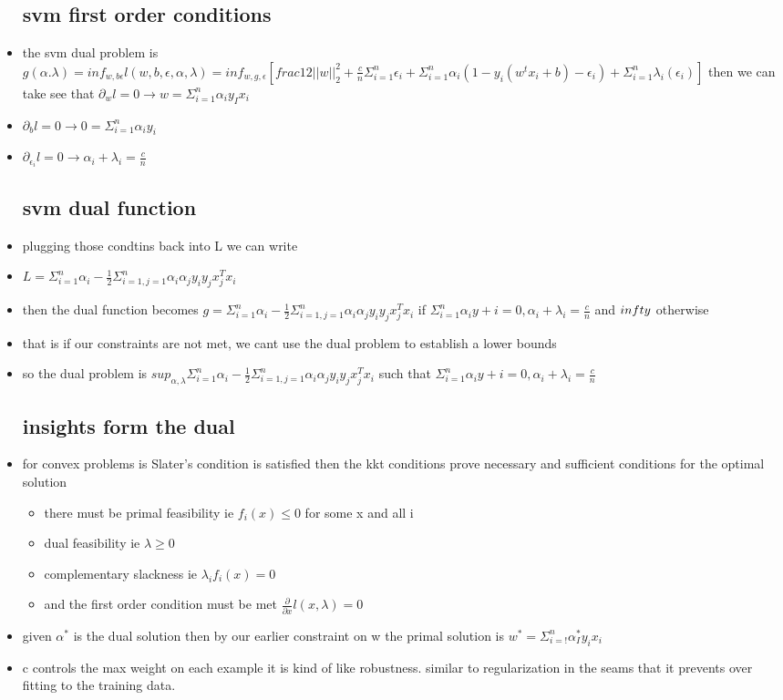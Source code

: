 \documentclass{article}
\begin{document}
\begin{itemize}
\subsection{svm first order conditions}
\item the svm dual problem is $g(\alpha. \lambda)=inf_{w,b\epsilon}l(w,b,\epsilon, \alpha, \lambda)=inf_{w,g,\epsilon}[frac{1}{2}||w||_{2}^{2}+\frac{c}{n}\Sigma_{i=1}^{n}\epsilon_i+\Sigma_{i=1}^{n}\alpha_{i}(1-y_i(w^{t}x_i+b)-\epsilon_{i})+\Sigma_{i=1}^{n}\lambda_{i}(\epsilon_{i})]$
\itme then we can take see that $\partial_{w}l=0\rightarrow w=\Sigma_{i=1}^{n}\alpha_{i}y_{I}x_{i}$
\item $\partial_{b}l=0\rightarrow 0=\Sigma_{i=1}^{n}\alpha_{i}y_{i}$
\item $\partial_{\epsilon_{i}}l=0\rightarrow \alpha_{i}+\lambda_{i}=\frac{c}{n}$
\subsection{svm dual function }
\item plugging those condtins back into L we can write 
\item $L=\Sigma_{i=1}^{n}\alpha_{i}-\frac{1}{2}\Sigma_{i=1,j=1}^{n}\alpha_{i}\alpha_jy_iy_jx_j^Tx_i$
\item then the dual function becomes $g=\Sigma_{i=1}^{n}\alpha_{i}-\frac{1}{2}\Sigma_{i=1,j=1}^{n}\alpha_{i}\alpha_jy_iy_jx_j^Tx_i$ if $\Sigma_{i=1}^{n}\alpha_iy+i=0, \alpha_i+\lambda_i=\frac{c}{n}$ and $\-infty$ otherwise 
\item that is if our constraints are not met, we cant use the dual problem to establish a lower bounds 
\item so the dual problem is $sup_{\alpha, \lambda } \Sigma_{i=1}^{n}\alpha_{i}-\frac{1}{2}\Sigma_{i=1,j=1}^{n}\alpha_{i}\alpha_jy_iy_jx_j^Tx_i$ such that $\Sigma_{i=1}^{n}\alpha_iy+i=0, \alpha_i+\lambda_i=\frac{c}{n}$
\subsection{insights form the dual}
\item for convex problems is Slater's condition is satisfied then the kkt conditions prove necessary and sufficient conditions for the optimal solution
\begin{itemize}
    \item there must be primal feasibility ie $f_{i}(x)\leq 0$ for some x and all i 
    \item dual feasibility ie $\lambda \geq 0$
    \item complementary slackness ie $\lambda_{i}f_{i}(x)=0$
    \item and the first order condition must be met $\frac{\partial}{\partial x}l(x,\lambda)=0$
\end{itemize}
\item given $\alpha^{*}$ is the dual solution then by our earlier constraint on w the primal solution is $w^{*}=\Sigma_{i=!}^{n}\alpha_{I}^{*}y_ix_i$
\item c controls the max weight on each example it is kind of like robustness. similar to regularization in the seams that it prevents over fitting to the training data.

\end{itemize}
\end{document}
